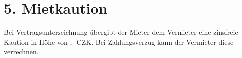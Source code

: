 \section*{5. Mietkaution}
Bei Vertragsunterzeichnung übergibt der Mieter dem Vermieter eine zinsfreie Kaution in Höhe von \DepositAmount,- CZK. Bei Zahlungsverzug kann der Vermieter diese verrechnen.
